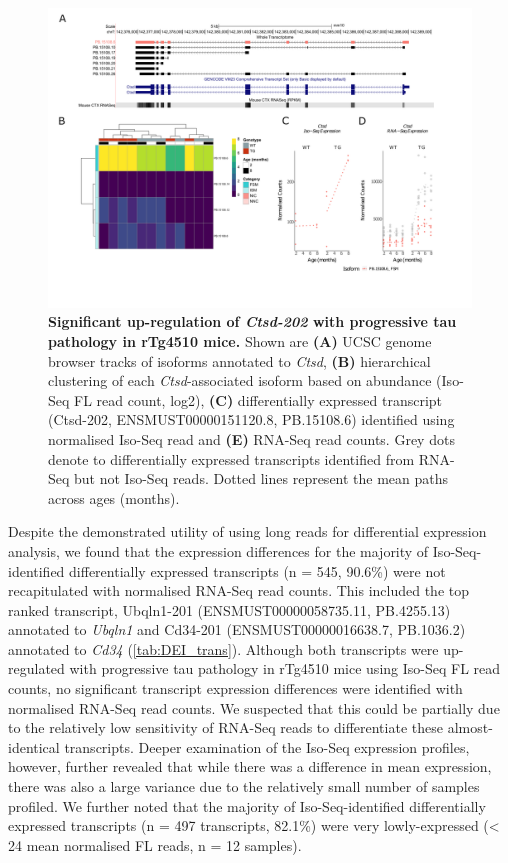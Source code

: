 \begin{landscape}
	\begin{figure}[!htp]
		\centering
		\includegraphics[page=1,trim={1.5cm 2.5cm 2cm 2cm}, scale = 0.85]{Figures/Ch5_DiffPlots_Landscape.pdf}
		\captionsetup{width=1.5\textwidth}
		\caption[Differential \textit{Ctsd} transcript expression]%
		{\textbf{Significant up-regulation of \textit{Ctsd-202} with progressive tau pathology in rTg4510 mice.} Shown are \textbf{(A)} UCSC genome browser tracks of isoforms annotated to \textit{Ctsd}, \textbf{(B)} hierarchical clustering of each \textit{Ctsd}-associated isoform based on abundance (Iso-Seq FL read count, log2), \textbf{(C)} differentially expressed transcript (Ctsd-202, ENSMUST00000151120.8, PB.15108.6) identified using normalised Iso-Seq read and \textbf{(E)} RNA-Seq read counts. Grey dots denote to differentially expressed transcripts identified from RNA-Seq but not Iso-Seq reads. Dotted lines represent the mean paths across ages (months).}   
		\label{fig:Ctsd}
	\end{figure}	
\end{landscape}

Despite the demonstrated utility of using long reads for differential expression analysis, we found that the expression differences for the majority of Iso-Seq-identified differentially expressed transcripts (n = 545, 90.6\%) were not recapitulated with normalised RNA-Seq read counts. This included the top ranked transcript, Ubqln1-201 (ENSMUST00000058735.11, PB.4255.13) annotated to \textit{Ubqln1} and Cd34-201 (ENSMUST00000016638.7, PB.1036.2) annotated to \textit{Cd34} (\cref{tab:DEI_trans}). Although both transcripts were up-regulated with progressive tau pathology in rTg4510 mice using Iso-Seq FL read counts, no significant transcript expression differences were identified with normalised RNA-Seq read counts. We suspected that this could be partially due to the relatively low sensitivity of RNA-Seq reads to differentiate these almost-identical transcripts. Deeper examination of the Iso-Seq expression profiles, however, further revealed that while there was a difference in mean expression, there was also a large variance due to the relatively small number of samples profiled. We further noted that the majority of Iso-Seq-identified differentially expressed transcripts (n = 497 transcripts, 82.1\%) were very lowly-expressed (< 24 mean normalised FL reads, n = 12 samples). 

